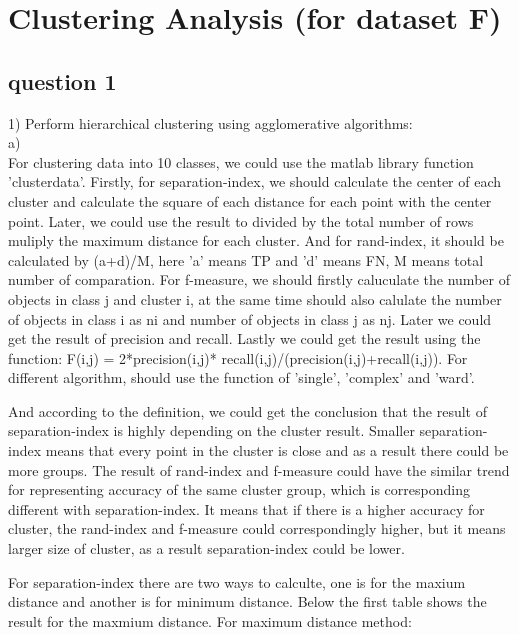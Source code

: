 \documentclass[]{article}
\begin{document}
\section{Clustering Analysis (for dataset F)}
\subsection{question 1}
1) Perform hierarchical clustering using agglomerative algorithms:\\
a)\\
For clustering data into 10 classes, we could use the matlab library function 'clusterdata'. Firstly, for separation-index, we should calculate the center of each cluster and calculate the square of each distance for each point with the center point. Later, we could use the result to divided by the total number of rows muliply the maximum distance for each cluster. And for rand-index, it should be calculated by (a+d)/M, here 'a' means TP and 'd' means FN, M means total number of comparation. For f-measure, we should firstly caluculate the number of objects in class j and cluster i, at the same time should also calulate the number of objects in class i as ni and number of objects in class j as nj. Later we could get the result of precision and recall. Lastly we could get the result using the function:   
F(i,j) = 2*precision(i,j)* recall(i,j)/(precision(i,j)+recall(i,j)).
For different algorithm, should use the function of 'single', 'complex' and 'ward'.




And according to the definition, we could get the conclusion that the result of separation-index is highly depending on the cluster result. Smaller separation-index means that every point in the cluster is close and as a result there could be more groups.
The result of rand-index and f-measure could have the similar trend for representing accuracy of the same cluster group, which is corresponding different with separation-index. It means that if there is a higher accuracy for cluster, the rand-index and f-measure could correspondingly higher, but it means larger size of cluster, as a result separation-index could be lower.



For separation-index there are two ways to calculte, one is for the maxium distance and another is for minimum distance. Below the first table shows the result for the maxmium distance.
For maximum distance method:

\end{document}
